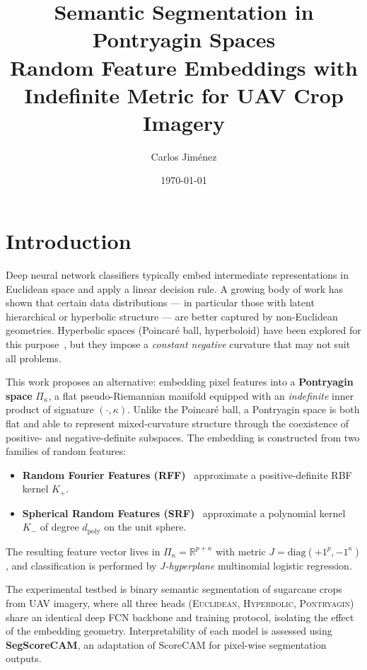 \documentclass[12pt,a4paper]{article}
\title{%
  \textbf{Semantic Segmentation in Pontryagin Spaces}\\
  \large Random Feature Embeddings with Indefinite Metric for UAV Crop Imagery
}
\author{Carlos Jiménez}
\date{\today}
\newcommand{\R}{\mathbb{R}}
\newcommand{\kap}{\kappa}
\newcommand{\dpoly}{d_{\mathrm{poly}}}
\theoremstyle{definition}
\begin{document}
\maketitle
\tableofcontents
\newpage

\section{Introduction}

Deep neural network classifiers typically embed intermediate representations
in Euclidean space and apply a linear decision rule.  A growing body of work
has shown that certain data distributions — in particular those with latent
hierarchical or hyperbolic structure — are better captured by non-Euclidean
geometries.  Hyperbolic spaces (Poincaré ball, hyperboloid) have been
explored for this purpose~\cite{ganea2018,atigh2022}, but they impose a
\emph{constant negative} curvature that may not suit all problems.

This work proposes an alternative: embedding pixel features into a
\textbf{Pontryagin space} $\Pi_\kap$, a flat pseudo-Riemannian manifold
equipped with an \emph{indefinite} inner product of signature $(\cdot, \kap)$.
Unlike the Poincaré ball, a Pontryagin space is both flat and able to
represent mixed-curvature structure through the coexistence of positive-
and negative-definite subspaces.  The embedding is constructed from two
families of random features:

\begin{itemize}[noitemsep]
  \item \textbf{Random Fourier Features (RFF)}~\cite{rahimi2007} approximate
        a positive-definite RBF kernel $K_+$.
  \item \textbf{Spherical Random Features (SRF)}~\cite{pennington2015}
        approximate a polynomial kernel $K_-$ of degree $\dpoly$ on the unit
        sphere.
\end{itemize}

The resulting feature vector lives in $\Pi_\kap = \R^{p+\kap}$ with metric
$J = \mathrm{diag}(+1^p, -1^\kap)$, and classification is performed by
\emph{J-hyperplane} multinomial logistic regression.

The experimental testbed is binary semantic segmentation of sugarcane crops
from UAV imagery, where all three heads (\textsc{Euclidean},
\textsc{Hyperbolic}, \textsc{Pontryagin}) share an identical deep FCN backbone
and training protocol, isolating the effect of the embedding geometry.
Interpretability of each model is assessed using \textbf{SegScoreCAM},
an adaptation of ScoreCAM for pixel-wise segmentation outputs.
\end{document}
